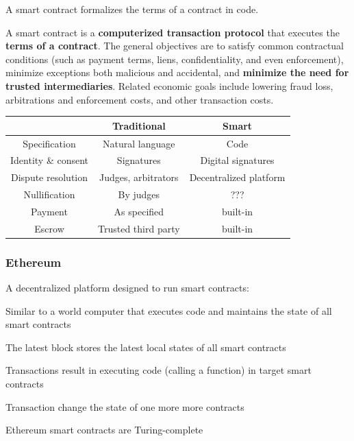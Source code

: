 \documentclass[11pt,oneside,a4paper]{article}
\begin{document}
\begin{center}
	A smart contract formalizes the terms of a contract in code.
\end{center}

A smart contract is a \textbf{computerized transaction protocol} that executes the \textbf{terms of a contract}. The general objectives are to satisfy common contractual conditions (such as payment terms, liens, confidentiality, and even enforcement), minimize exceptions both malicious and accidental, and \textbf{minimize the need for trusted intermediaries}. Related economic goals include lowering fraud loss, arbitrations and enforcement costs, and other transaction costs.\\

\begin{center}
	\begin{tabular}{|c|c|c|}
		\hline
		& Traditional & Smart \\
		\hline
		Specification & Natural language & Code \\
		\hline
		Identity \& consent & Signatures & Digital signatures \\
		\hline
		Dispute resolution & Judges, arbitrators & Decentralized platform \\
		\hline
		Nullification & By judges & ??? \\
		\hline
		Payment & As specified & built-in \\
		\hline
		Escrow & Trusted third party & built-in \\
		\hline
	\end{tabular}
\end{center}

\subsubsection{Ethereum}

A decentralized platform designed to run smart contracts:

\begin{compactitem}
	\item Similar to a world computer that executes code and maintains the state of all smart contracts
	\item The latest block stores the latest local states of all smart contracts
	\item Transactions result in executing code (calling a function) in target smart contracts
	\item Transaction change the state of one more more contracts
	\item Ethereum smart contracts are Turing-complete
\end{compactitem}

\titlespacing{\subsection}{0pt}{2ex}{2ex}

\label{lastpage} %
\clearpage
{}



\clearpage
\appendix
{}
\end{document}
